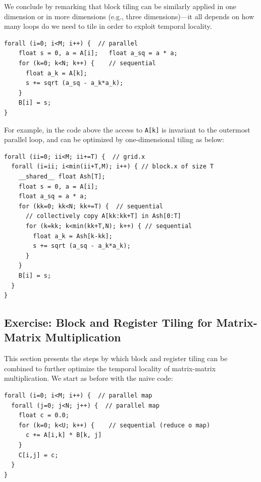 \documentclass[acmsmall,review]{acmart}\settopmatter{printfolios=true,printccs=false,printacmref=false}
\begin{document}
We conclude by remarking that block tiling can be similarly applied
in one dimension or in more dimensions (e.g., three dimensions)---it
all depends on how many loops do we need to tile in order to exploit
temporal locality.  
\begin{lstlisting}[mathescape=true]
forall (i=0; i<M; i++) {  // parallel
    float s = 0, a = A[i];   float a_sq = a * a;
    for (k=0; k<N; k++) {    // sequential
      float a_k = A[k];
      s += sqrt (a_sq - a_k*a_k);
    }
    B[i] = s;
}
\end{lstlisting}\vspace{-1ex}

For example, in the code above the access to {\tt A[k]} is invariant to the
outermost parallel loop, and can be optimized by one-dimensional tiling as below:
\begin{lstlisting}[mathescape=true]
forall (ii=0; ii<M; ii+=T) {  // grid.x
  forall (i=ii; i<min(ii+T,M); i++) { // block.x of size T
    __shared__ float Ash[T];
    float s = 0, a = A[i];
    float a_sq = a * a;
    for (kk=0; kk<N; kk+=T) {  // sequential
      // collectively copy A[kk:kk+T] in Ash[0:T]
      for (k=kk; k<min(kk+T,N); k++) { // sequential
        float a_k = Ash[k-kk];
        s += sqrt (a_sq - a_k*a_k);
      }
    }
    B[i] = s;
  } 
}
\end{lstlisting}\vspace{-1ex}


\subsection{Exercise: Block and Register Tiling for Matrix-Matrix Multiplication}
\label{subsec:block-reg-tiled-mmm}

This section presents the steps by which block and register tiling can
be combined to further optimize the temporal locality of matrix-matrix
multiplication.  We start as before with the naive code:
\begin{lstlisting}[mathescape=true]
forall (i=0; i<M; i++) {  // parallel map
  forall (j=0; j<N; j++) {  // parallel map
    float c = 0.0;
    for (k=0; k<U; k++) {    // sequential (reduce o map)
      c += A[i,k] * B[k, j]
    }
    C[i,j] = c;
  } 
}
\end{lstlisting}\vspace{-1ex}
\end{document}
